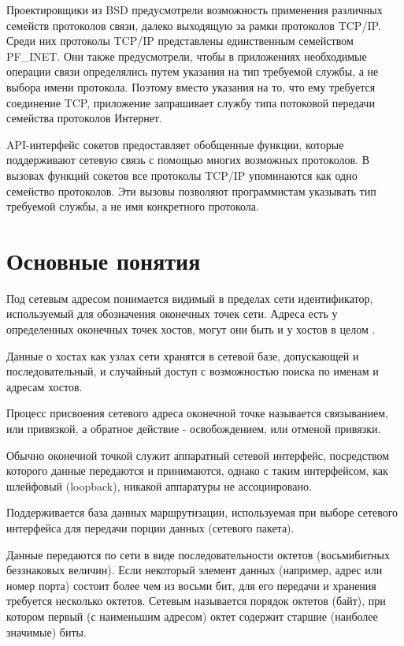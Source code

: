 Проектировщики из BSD предусмотрели возможность применения различных семейств протоколов связи,  далеко выходящую за рамки протоколов TCP/IP. 
Среди них протоколы TCP/IP представлены единственным семейством PF\_INET. Они также предусмотрели,  
чтобы в приложениях необходимые операции связи определялись путем указания на тип требуемой службы,  
а не выбора имени протокола. Поэтому вместо указания на то,  что ему требуется соединение TCP,
приложение запрашивает службу типа потоковой передачи семейства протоколов Интернет.

API-интерфейс сокетов предоставляет обобщенные функции,  которые поддерживают сетевую связь с помощью многих возможных протоколов. В вызовах функций сокетов все протоколы TCP/IP упоминаются как одно семейство протоколов. Эти вызовы позволяют программистам указывать тип требуемой службы,  а не имя конкретного протокола.

\section{Основные понятия}

Под сетевым адресом понимается видимый в пределах сети идентификатор, используемый для обозначения оконечных точек сети. Адреса есть у определенных оконечных точек хостов, могут они быть и у хостов в целом \cite{intuit-galatenko-01}.

Данные о хостах как узлах сети хранятся в сетевой базе, допускающей и последовательный, и случайный доступ с возможностью поиска по именам и адресам хостов. 

Процесс присвоения сетевого адреса оконечной точке называется связыванием, или привязкой, а обратное действие - освобождением, или отменой привязки. 

Обычно оконечной точкой служит аппаратный сетевой интерфейс, посредством которого данные передаются и принимаются, однако с таким интерфейсом, как шлейфовый (loopback), никакой аппаратуры не ассоциировано. 

Поддерживается база данных маршрутизации, используемая при выборе сетевого интерфейса для передачи порции данных (сетевого пакета). 

Данные передаются по сети в виде последовательности октетов (восьмибитных беззнаковых величин). Если некоторый элемент данных (например, адрес или номер порта) состоит более чем из восьми бит, для его передачи и хранения требуется несколько октетов. Сетевым называется порядок октетов (байт), при котором первый (с наименьшим адресом) октет содержит старшие (наиболее значимые) биты. 

